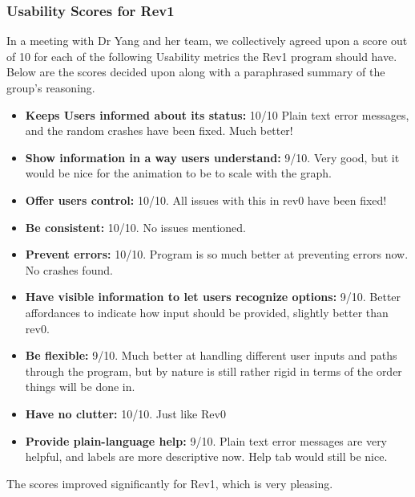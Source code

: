 \documentclass[12pt, titlepage]{article}
\begin{document}
\subsubsection{Usability Scores for Rev1} In a meeting with Dr Yang and her team, we collectively agreed upon a score out of 10 for each of the following Usability metrics the
Rev1 program should have. Below are the scores decided upon along with a paraphrased summary of the group's reasoning.\\
\begin{itemize}
\item \textbf{Keeps Users informed about its status:} 10/10 Plain text error messages, and the random crashes have been fixed. Much better!\\
\item \textbf{Show information in a way users understand:} 9/10. Very good, but it would be nice for the animation to be to scale with the graph.\\
\item \textbf{Offer users control:} 10/10. All issues with this in rev0 have been fixed!\\
\item \textbf{Be consistent:} 10/10. No issues mentioned.\\
\item \textbf{Prevent errors:} 10/10. Program is so much better at preventing errors now. No crashes found.\\
\item \textbf{Have visible information to let users recognize options:} 9/10. Better affordances to indicate how input should be provided, slightly better than rev0.\\
\item \textbf{Be flexible:} 9/10. Much better at handling different user inputs and paths through the program, but by nature is still rather rigid in terms of the order things will be done in.\\
\item \textbf{Have no clutter:} 10/10. Just like Rev0\\
\item \textbf{Provide plain-language help:} 9/10. Plain text error messages are very helpful, and labels are more descriptive now. Help tab would still be nice.\\
\end{itemize}
The scores improved significantly for Rev1, which is very pleasing.
\end{document}
